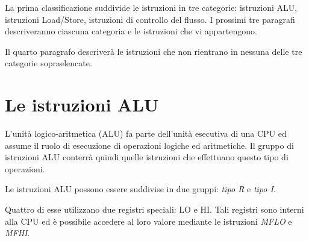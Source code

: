\documentclass[letterpaper,10pt,italian]{sphinxmanual}
\begin{document}
La prima classificazione suddivide le istruzioni in tre categorie: istruzioni
ALU, istruzioni Load/Store, istruzioni di controllo del flusso. I prossimi tre
paragrafi descriveranno ciascuna categoria e le istruzioni che vi
appartengono.

Il quarto paragrafo descriverà le istruzioni che non rientrano in nessuna
delle tre categorie sopraelencate.


\section{Le istruzioni ALU}
\label{instructions:le-istruzioni-alu}
L'unità logico-aritmetica (ALU) fa parte dell'unità esecutiva di una
CPU ed assume il ruolo di esecuzione di operazioni logiche ed aritmetiche. Il
gruppo di istruzioni ALU conterrà quindi quelle istruzioni che effettuano
questo tipo di operazioni.

Le istruzioni ALU possono essere suddivise in due gruppi: \emph{tipo R} e
\emph{tipo I}.

Quattro di esse utilizzano due registri speciali: LO e HI. Tali registri sono
interni alla CPU ed è possibile accedere al loro valore mediante le
istruzioni \emph{MFLO} e \emph{MFHI}.
\end{document}
